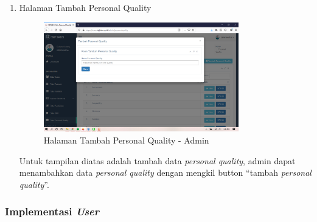 \begin{enumerate}
	\newpage
	\item Halaman Tambah Personal Quality
	\begin{figure}
		\centering
		\includegraphics[width=0.8\textwidth]
		{pics/admin/implementasi/tambahpersonalquality.png}
		\caption{Halaman Tambah Personal Quality - Admin}
		\label{fig:CC10}
	\end{figure}
	Untuk tampilan diatas adalah tambah data \textit{personal quality}, admin dapat menambahkan data \textit{personal quality} dengan mengkil button “tambah \textit{personal quality}”.
	
\end{enumerate}

\subsubsection{Implementasi \textit{User}}


